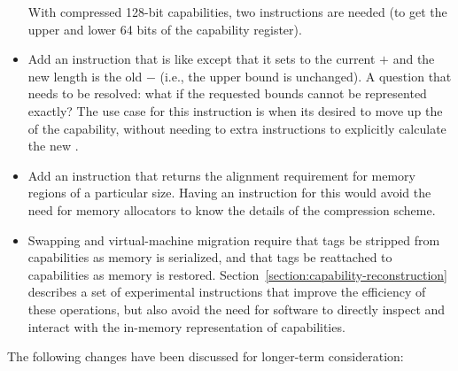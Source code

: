 \begin{itemize}
  With compressed 128-bit capabilities, two instructions are needed (to get
  the upper and lower 64 bits of the capability register).

\item
  Add an instruction that is like  except that it
  sets \cbase{} to the current \cbase{} $+$ \coffset{} and the new length
  is the old \clength{} $-$ \coffset{} (i.e., the upper bound is unchanged).
  A question that needs to be resolved: what if the requested bounds cannot
  be represented exactly? The use case for this instruction is when its
  desired to move up the \cbase{} of the capability, without needing to
  extra instructions to explicitly calculate the new \clength{}.

\item
  Add an instruction that returns the alignment requirement for memory regions
  of a particular size. Having an instruction for this would avoid the
  need for memory allocators to know the details of the compression scheme.

\item Swapping and virtual-machine migration require that tags be stripped
  from capabilities as memory is serialized, and that tags be reattached to
  capabilities as memory is restored.
  Section~\ref{section:capability-reconstruction} describes a set of
  experimental instructions that improve the efficiency of these operations,
  but also avoid the need for software to directly inspect and interact with
  the in-memory representation of capabilities.
\end{itemize}

The following changes have been discussed for longer-term consideration:

